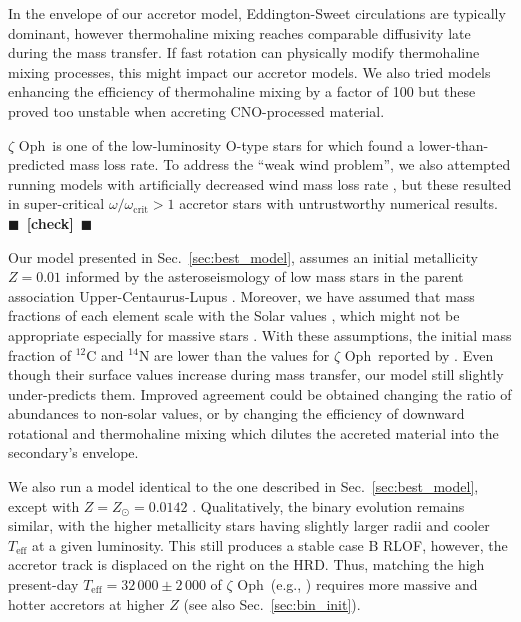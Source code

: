 \documentclass[twocolumn,twocolappendix,trackchanges]{aastex63}
\DeclareRobustCommand{\Secref}[1]{Sec.~\ref{#1}}
\newcommand{\zoph}{$\zeta$ Oph}
\newcommand{\todo}[1]{{\large $\blacksquare$~\textbf{\color{red}[#1]}}~$\blacksquare$}
\begin{document}
In the envelope of our accretor model, Eddington-Sweet circulations are
typically dominant, however thermohaline mixing reaches comparable
diffusivity late during the mass transfer. If fast rotation can
physically modify thermohaline mixing processes, this might impact our
accretor models.  We also tried models enhancing the efficiency of
thermohaline mixing by a factor of 100 \citep{schootemeijer:19} but
these proved too unstable when accreting CNO-processed material.

\zoph\ is one of the low-luminosity O-type stars for which
\cite{marcolino:09} found a lower-than-predicted mass loss rate.
To address the ``weak wind problem'', we also attempted
running models with artificially decreased wind mass loss rate
\citep[e.g.,][]{renzo:17}, but these resulted in super-critical
$\omega/\omega_\mathrm{crit}>1$ accretor stars with untrustworthy
numerical results. \todo{check}

Our model presented in \Secref{sec:best_model}, assumes an initial
metallicity $Z=0.01$ informed by the asteroseismology of low mass
stars in the parent association Upper-Centaurus-Lupus
\citep[e.g.,][]{murphy:21}. Moreover, we have assumed that mass
fractions of each element scale with the Solar values
\citep{grevesse:98}, which might not be appropriate especially for
massive stars \citep[e.g.,][]{grasha:21}. With these assumptions, the
initial mass fraction of $^{12}\mathrm{C}$ and $^{14}\mathrm{N}$ are
lower than the values for \zoph\ reported by
. Even though their surface values increase
during mass transfer, our model still slightly under-predicts
them. Improved agreement could be obtained changing the ratio of
abundances to non-solar values, or by changing the efficiency of
downward rotational and thermohaline mixing which dilutes the accreted
material into the secondary's envelope.

We also run a model identical to the one described in
\Secref{sec:best_model}, except with $Z=Z_\odot=0.0142$
\citep{asplund:09}. Qualitatively, the binary evolution remains
similar, with the higher metallicity stars having slightly larger
radii and cooler $T_\mathrm{eff}$ at a given luminosity. This still
produces a stable case B RLOF, however, the accretor track is
displaced on the right on the HRD. Thus, matching the high present-day
$T_\mathrm{eff}=32\,000\pm2\,000$ of \zoph\ (e.g., ) requires more
massive and hotter accretors at higher $Z$ (see also \Secref{sec:bin_init}).
\end{document}
